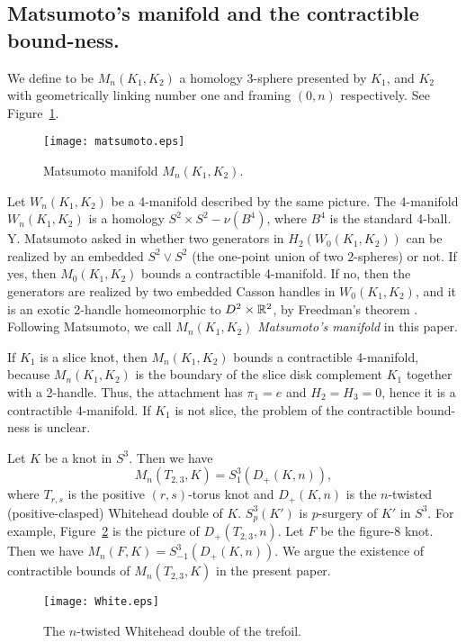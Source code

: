 \documentclass[11pt]{amsart}
\begin{document}
\subsection{Matsumoto's manifold and the contractible bound-ness.}
We define to be $M_n(K_1,K_2)$ a homology 3-sphere presented by $K_1$, and $K_2$ with geometrically linking number one and 
framing $(0,n)$ respectively. 
See {\sc Figure}~\ref{matsumoto}.
\begin{figure}[htpb]
\begin{center}\texttt{[image: matsumoto.eps]}\caption{Matsumoto manifold $M_n(K_1,K_2)$.}\label{matsumoto}\end{center}
\end{figure}
Let $W_n(K_1,K_2)$ be a 4-manifold described by the same picture.
The 4-manifold $W_n(K_1,K_2)$ is a homology $S^2\times S^2-\nu(B^4)$, where $B^4$ is the standard 4-ball.
Y. Matsumoto asked in \cite{K} whether two generators in $H_2(W_0(K_1,K_2))$ can be realized by an embedded $S^2\vee S^2$ (the one-point union of two 2-spheres) or not.
If yes, then $M_0(K_1,K_2)$ bounds a contractible 4-manifold.
If no, then the generators are realized by two embedded Casson handles in $W_0(K_1,K_2)$, and it is an exotic 2-handle homeomorphic to $D^2\times {\Bbb R}^2$, by Freedman's theorem \cite{Fr}.
Following Matsumoto, we call $M_n(K_1,K_2)$ {\it Matsumoto's manifold} in this paper.

If $K_1$ is a slice knot, then $M_n(K_1,K_2)$ bounds a contractible 4-manifold, because 
$M_n(K_1,K_2)$ is the boundary of the slice disk complement $K_1$ together with a 2-handle.
Thus, the attachment has $\pi_1=e$ and $H_2=H_3=0$, hence it is a contractible 4-manifold.
If $K_1$ is not slice, the problem of the contractible bound-ness is unclear.

Let $K$ be a knot in $S^3$.
Then we have
$$M_n(T_{2,3},K)=S^3_1(D_+(K,n)),$$
where $T_{r,s}$ is the positive $(r,s)$-torus knot and
$D_+(K,n)$ is the $n$-twisted (positive-clasped) Whitehead double of $K$.
$S^3_p(K')$ is $p$-surgery of $K'$ in $S^3$.
For example, {\sc Figure}~\ref{Wdouble} is the picture of $D_+(T_{2,3},n)$.
Let $F$ be the figure-8 knot.
Then we have $M_n(F,K)=S^3_{-1}(D_+(K,n))$.
We argue the existence of contractible bounds of $M_n(T_{2,3},K)$ in the present paper.
\begin{figure}[htbp]
\begin{center}
\texttt{[image: White.eps]}
\caption{The $n$-twisted Whitehead double of the trefoil.}
\label{Wdouble}
\end{center}
\end{figure}
\end{document}
